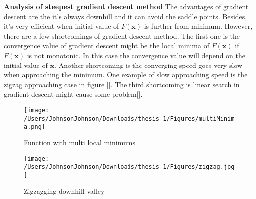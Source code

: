 \textbf{Analysis of steepest gradient descent method} The advantages of gradient descent are the it's always downhill and it can avoid the saddle points. Besides, it's very efficient when initial value of $F(\bm{x})$ is further from minimum. However, there are a few shortcomings of gradient descent method. The first one is the convergence value of gradient descent might be the local minima of $F(\bm{x})$ if $F(\bm{x})$ is not monotonic. In this case the convergence value will depend on the initial value of $\bm{x}$. Another shortcoming is the converging speed goes very slow when approaching the minimum. One example of slow approaching speed is the zigzag approaching case in figure []. The third shortcoming is linear search in gradient descent might cause some problem[].

\begin{figure}[H]
\begin{minipage}[t]{0.5\linewidth}
\centering
\texttt{[image: /Users/JohnsonJohnson/Downloads/thesis\_1/Figures/multiMinima.png]}
\caption{Function with multi local minimums}
\label{fig:side:a}
\end{minipage}%
\begin{minipage}[t]{0.5\linewidth}
\centering
\texttt{[image: /Users/JohnsonJohnson/Downloads/thesis\_1/Figures/zigzag.jpg]}
\caption{Zigzagging downhill valley}
\label{fig:side:b}
\end{minipage}
\end{figure}
  
 
